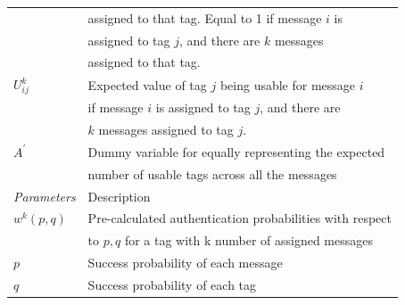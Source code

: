 \begin{table} [htbp]
\begin{center}
{\begin{tabular}{|l|l|}
                               & assigned to that tag. Equal to 1 if message $i$ is \\
                               & assigned to tag $j$, and there are $k$ messages \\ & assigned to that tag.\\
                    $U_{ij}^k$ & Expected value of tag $j$ being usable for message $i$ \\
                    &if message $i$ is assigned to tag $j$, and there are \\
                    & $k$ messages assigned to tag $j$.\\
                   $A^\prime$ & Dummy variable for equally representing the expected  \\
                    & number of usable tags across all the messages\\
				\hline\it{Parameters} & {Description}\\ \hline
    
				$w^k (p,q) $ & Pre-calculated authentication probabilities with respect\\
                                     &  to $p, q$ for a tag with k number of assigned messages\\
				$p$ & Success probability of each message \\
                    $q$ & Success probability of each tag \\
				\hline
			\end{tabular}
		}
	\end{center}
\end{table}




